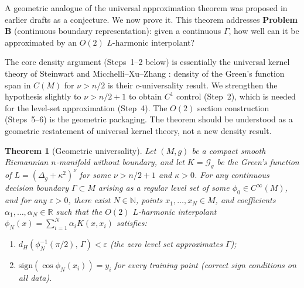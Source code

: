 \documentclass[11pt, a4paper]{article}
\theoremstyle{plain}
\newtheorem{theorem}{Theorem}[section]
\theoremstyle{definition}
\newcommand{\Gam}{\Gamma}
\newcommand{\Gr}{\mathcal{G}}   %
\begin{document}
A geometric analogue of the universal approximation theorem \cite{hornik1989} was proposed in earlier
drafts as a conjecture. We now prove it. This theorem addresses \textbf{Problem B}
(continuous boundary representation): given a continuous $\Gam$, how well can it
be approximated by an $O(2)$ $L$-harmonic interpolant?

The core density argument (Steps~1--2 below) is essentially the universal kernel
theory of Steinwart \cite{steinwart2001} and Micchelli--Xu--Zhang
\cite{micchelli2006}: density of the Green's function span in $C(M)$ for
$\nu > n/2$ is their $c$-universality result. We strengthen the hypothesis
slightly to $\nu > n/2 + 1$ to obtain $C^1$ control (Step~2), which is needed
for the level-set approximation (Step~4). The $O(2)$ section construction
(Steps~5--6) is the geometric packaging. The theorem should be understood as a
geometric restatement of universal kernel theory, not a new density result.

\begin{theorem}[Geometric universality]\label{thm:universal}
Let $(M, g)$ be a compact smooth Riemannian $n$-manifold without boundary, and let
$K = \Gr_g$ be the Green's function of $L = (\Delta_g + \kappa^2)^\nu$ for some
$\nu > n/2 + 1$ and $\kappa > 0$. For any continuous decision boundary
$\Gamma \subset M$ arising as a regular level set of some $\phi_0 \in C^\infty(M)$,
and for any $\varepsilon > 0$, there exist $N \in \mathbb{N}$, points
$x_1,\ldots,x_N \in M$, and coefficients $\alpha_1,\ldots,\alpha_N \in \mathbb{R}$
such that the $O(2)$ $L$-harmonic interpolant
$\phi_N(x) = \sum_{i=1}^N \alpha_i K(x, x_i)$
satisfies:
\begin{enumerate}[label=(\roman*), itemsep=2pt]
  \item $d_H\!\left(\phi_N^{-1}(\pi/2),\,\Gamma\right) < \varepsilon$
        \textnormal{(the zero level set approximates $\Gamma$)};
  \item $\mathrm{sign}(\cos\phi_N(x_i)) = y_i$ for every training point
        \textnormal{(correct sign conditions on all data)}.
\end{enumerate}
\end{theorem}
\end{document}
